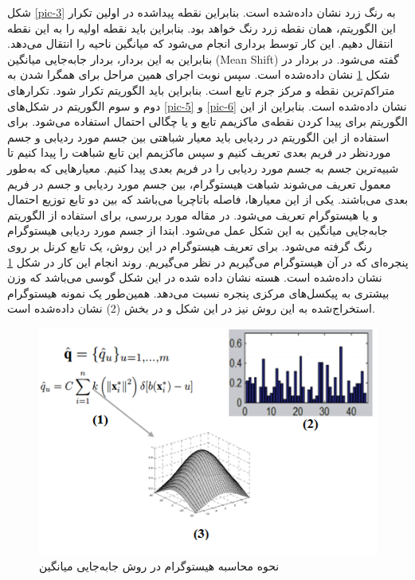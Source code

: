 \documentclass[paper=a4, fontsize=12pt]{article} %
\begin{document}
شکل \ref{pic-3} به رنگ زرد نشان داده‌شده است. بنابراین نقطه پیداشده در اولین تکرار این الگوریتم، همان نقطه زرد رنگ خواهد بود. بنابراین باید نقطه اولیه را به این نقطه انتقال دهیم. این کار توسط برداری انجام می‌شود که میانگین ناحیه را انتقال می‌دهد. بنابراین به این بردار، بردار جابه‌جایی میانگین (Mean Shift) گفته می‌شود. در بردار در شکل \ref{pic-4} نشان داده‌شده است. سپس نوبت اجرای همین مراحل برای همگرا شدن به متراکم‌ترین نقطه و مرکز جرم تابع است. بنابراین باید الگوریتم تکرار شود. تکرار‌های دوم و سوم الگوریتم در شکل‌های \ref{pic-5} و \ref{pic-6} نشان داده‌شده است.
بنابراین از این الگوریتم برای پیدا کردن نقطه‌ی ماکزیمم تابع و یا چگالی احتمال استفاده می‌شود. برای استفاده از این الگوریتم در ردیابی باید معیار شباهتی بین جسم مورد ردیابی و جسم موردنظر در فریم بعدی تعریف کنیم و سپس ماکزیمم این تابع شباهت را پیدا کنیم تا شبیه‌ترین جسم به جسم مورد ردیابی را در فریم بعدی پیدا کنیم. معیار‌هایی که به‌طور معمول تعریف می‌شوند شباهت هیستوگرام، بین جسم مورد ردیابی و جسم در فریم بعدی می‌باشند. یکی از این معیارها، فاصله باتاچریا  می‌باشد که بین دو تابع توزیع احتمال و یا هیستوگرام تعریف می‌شود.
در مقاله مورد بررسی، برای استفاده از الگوریتم جابه‌جایی میانگین به این شکل عمل می‌شود. ابتدا از جسم مورد ردیابی هیستوگرام رنگ گرفته می‌شود. برای تعریف هیستوگرام در این روش، یک تابع کرنل بر روی پنجره‌ای که در آن هیستوگرام می‌گیریم در نظر می‌گیریم. روند انجام این کار در شکل \ref{pic-4} نشان داده‌شده است. 
هسته نشان داده شده در این شکل گوسی می‌باشد که وزن بیشتری به پیکسل‌های مرکزی پنجره نسبت می‌دهد. همین‌طور یک نمونه هیستوگرام استخراج‌شده به این روش نیز در این شکل و در بخش (2) نشان داده‌شده است.
\begin{figure}[h]
\centering
\includegraphics[scale=0.8]{fig4.png}
\caption{نحوه محاسبه هیستوگرام در روش جابه‌جایی میانگین}
\label{pic-4}
\end{figure}
\end{document}
